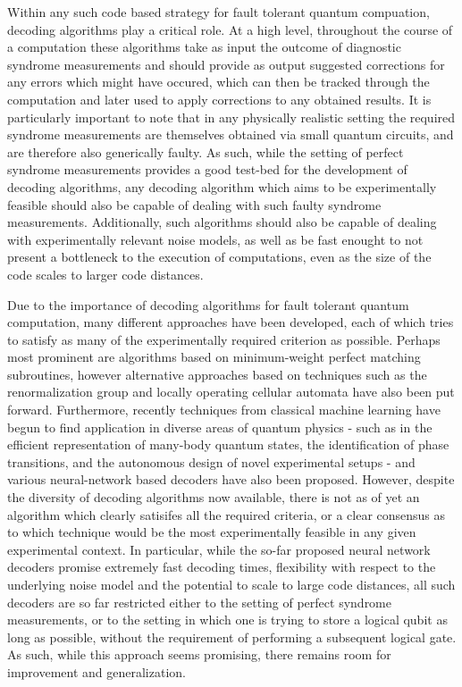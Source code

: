 \documentclass[onecolumn,preprintnumbers,amsmath,amssymb,notitlepage,nofootinbib,longbibliography,superscriptaddress]{revtex4-1}
\begin{document}
    Within any such code based strategy for fault tolerant quantum compuation, decoding algorithms play a critical role. At a high level, throughout the course of a computation these algorithms take as input the outcome of diagnostic syndrome measurements and should provide as output suggested corrections for any errors which might have occured, which can then be tracked through the computation and later used to apply corrections to any obtained results. It is particularly important to note that in any physically realistic setting the required syndrome measurements are themselves obtained via small quantum circuits, and are therefore also generically faulty. As such, while the setting of perfect syndrome measurements provides a good test-bed for the development of decoding algorithms, any decoding algorithm which aims to be experimentally feasible should also be capable of dealing with such faulty syndrome measurements. Additionally, such algorithms should also be capable of dealing with experimentally relevant noise models, as well as be fast enought to not present a bottleneck to the execution of computations, even as the size of the code scales to larger code distances.

    Due to the importance of decoding algorithms for fault tolerant quantum computation, many different approaches have been developed, each of which tries to satisfy as many of the experimentally required criterion as possible. Perhaps most prominent are algorithms based on minimum-weight perfect matching subroutines, however alternative approaches based on techniques such as the renormalization group and locally operating cellular automata have also been put forward. Furthermore, recently techniques from classical machine learning have begun to find application in diverse areas of quantum physics - such as in the efficient representation of many-body quantum states, the identification of phase transitions, and the autonomous design of novel experimental setups - and various neural-network based decoders have also been proposed. However, despite the diversity of decoding algorithms now available, there is not as of yet an algorithm which clearly satisifes all the required criteria, or a clear consensus as to which technique would be the most experimentally feasible in any given experimental context. In particular, while the so-far proposed neural network decoders promise extremely fast decoding times, flexibility with respect to the underlying noise model and the potential to scale to large code distances, all such decoders are so far restricted either to the setting of perfect syndrome measurements, or to the setting in which one is trying to store a logical qubit as long as possible, without the requirement of performing a subsequent logical gate.  As such, while this approach seems promising, there remains room for improvement and generalization.
\end{document}
